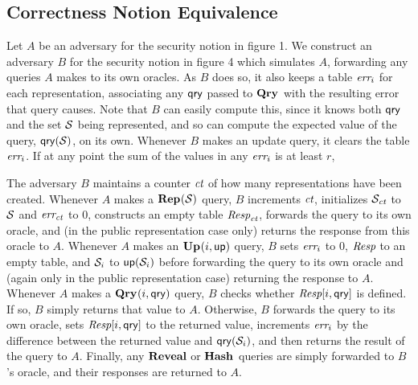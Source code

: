 \subsection{Correctness Notion Equivalence}
Let $A$ be an adversary for the security notion in figure 1. We construct an adversary $B$ for the security notion in figure 4 which simulates $A$, forwarding any queries $A$ makes to its own oracles. As $B$ does so, it also keeps a table $\textit{err}_i$ for each representation, associating any $\mathsf{qry}$ passed to $\mathbf{Qry}\hspace{0.5pt}$ with the resulting error that query causes. Note that $B$ can easily compute this, since it knows both $\mathsf{qry}$ and the set $\mathcal{S}$ being represented, and so can compute the expected value of the query, $\mathsf{qry}(\mathcal{S})$, on its own. Whenever $B$ makes an update query, it clears the table $\textit{err}_i$. If at any point the sum of the values in any $\textit{err}_i$ is at least $r$, 

The adversary $B$ maintains a counter $\textit{ct}$ of how many representations have been created. Whenever $A$ makes a $\mathbf{Rep}\hspace{0.5pt}(\mathcal{S})$ query, $B$ increments $\textit{ct}$, initializes $\mathcal{S}_{\textit{ct}}$ to $\mathcal{S}$ and $\textit{err}_{\textit{ct}}$ to 0, constructs an empty table $\textit{Resp}_{\textit{ct}}$, forwards the query to its own oracle, and (in the public representation case only) returns the response from this oracle to $A$. Whenever $A$ makes an $\mathbf{Up}\hspace{0.5pt}(i,\mathsf{up})$ query, $B$ sets $\textit{err}_i$ to 0, $\textit{Resp}$ to an empty table, and $\mathcal{S}_i$ to $\mathsf{up}(\mathcal{S}_i)$ before forwarding the query to its own oracle and (again only in the public representation case) returning the response to $A$. Whenever $A$ makes a $\mathbf{Qry}\hspace{0.5pt}(i,\mathsf{qry})$ query, $B$ checks whether $\textit{Resp}[i,\mathsf{qry}]$ is defined. If so, $B$ simply returns that value to $A$. Otherwise, $B$ forwards the query to its own oracle, sets $\textit{Resp}[i,\mathsf{qry}]$ to the returned value, increments $\textit{err}_i$ by the difference between the returned value and $\mathsf{qry}(\mathcal{S}_i)$, and then returns the result of the query to $A$. Finally, any $\mathbf{Reveal}$ or $\mathbf{Hash}\hspace{0.5pt}$ queries are simply forwarded to $B$'s oracle, and their responses are returned to $A$.

